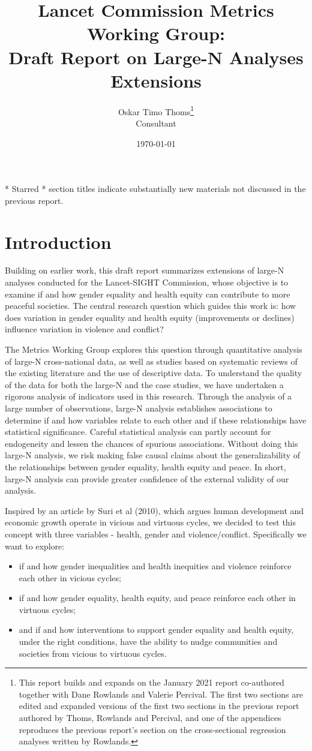 \documentclass[12pt]{article}
\author{Oskar Timo Thoms\thanks{This report builds and expands on the January 2021 report co-authored together with Dane Rowlands and Valerie Percival. The first two sections are edited and expanded versions of the first two sections in the previous report authored by Thoms, Rowlands and Percival, and one of the appendices reproduces the previous report's section on the cross-sectional regression analyses written by Rowlands.}\\Consultant}
\title{Lancet Commission Metrics Working Group:\\Draft Report on Large-N Analyses Extensions}
\date{\today}
\begin{document}
\maketitle
\clearpage
\tableofcontents
\bigskip
\begin{center}
* Starred * section titles indicate substantially new materials not discussed in the previous report.
\end{center}

\clearpage

\section{Introduction}
\label{intro}

Building on earlier work, this draft report summarizes extensions of large-N analyses conducted for the Lancet-SIGHT Commission, whose objective is to examine if and how gender equality and health equity can contribute to more peaceful societies.
The central research question which guides this work is: how does variation in gender equality and health equity (improvements or declines) influence variation in violence and conflict?

The Metrics Working Group explores this question through quantitative analysis of large-N cross-national data, as well as studies based on systematic reviews of the existing literature and the use of descriptive data. To understand the quality of the data for both the large-N and the case studies, we have undertaken a rigorous analysis of indicators used in this research.
Through the analysis of a large number of observations, large-N analysis establishes associations to determine if and how variables relate to each other and if these relationships have statistical significance. Careful statistical analysis can partly account for endogeneity and lessen the chances of spurious associations. Without doing this large-N analysis, we risk making false causal claims about the generalizability of the relationships between gender equality, health equity and peace. In short, large-N analysis can provide greater confidence of the external validity of our analysis.

Inspired by an article by Suri et al (2010), which argues human development and economic growth operate in vicious and virtuous cycles, we decided to test this concept with three variables - health, gender and violence/conflict. Specifically we want to explore:
\begin{itemize}
\item if and how gender inequalities and health inequities and violence reinforce each other in vicious cycles;
\item if and how gender equality, health equity, and peace reinforce each other in virtuous cycles;
\item and if and how interventions to support gender equality and health equity, under the right conditions, have the ability to nudge communities and societies from vicious to virtuous cycles.
\end{itemize}
\end{document}
